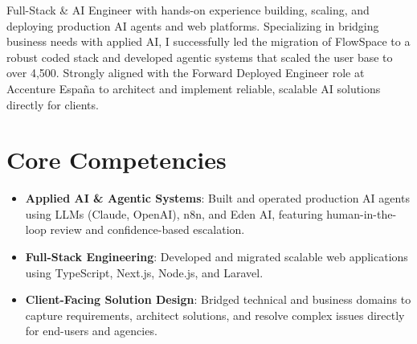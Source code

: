\documentclass[11pt,a4paper,sans]{moderncv}
\begin{document}
\makecvtitle

Full-Stack \& AI Engineer with hands-on experience building, scaling, and deploying production AI agents and web platforms. Specializing in bridging business needs with applied AI, I successfully led the migration of FlowSpace to a robust coded stack and developed agentic systems that scaled the user base to over 4,500. Strongly aligned with the Forward Deployed Engineer role at Accenture Espa\~na to architect and implement reliable, scalable AI solutions directly for clients.

\section{Core Competencies}
\begin{itemize}
\item \textbf{Applied AI \& Agentic Systems}: Built and operated production AI agents using LLMs (Claude, OpenAI), n8n, and Eden AI, featuring human-in-the-loop review and confidence-based escalation.
\item \textbf{Full-Stack Engineering}: Developed and migrated scalable web applications using TypeScript, Next.js, Node.js, and Laravel.
\item \textbf{Client-Facing Solution Design}: Bridged technical and business domains to capture requirements, architect solutions, and resolve complex issues directly for end-users and agencies.
\end{itemize}
\end{document}
